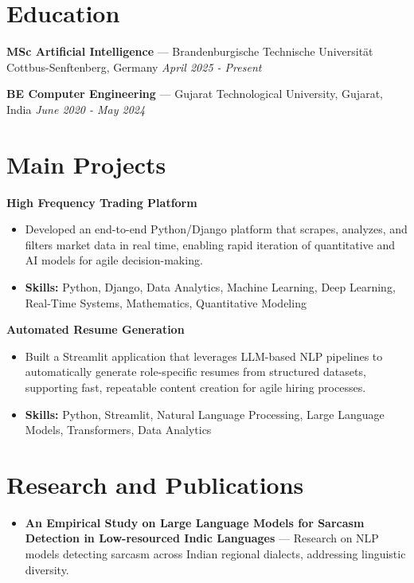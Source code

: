 \documentclass[a4paper,10pt]{article}
\begin{document}
\section*{Education}
\textbf{MSc Artificial Intelligence} — Brandenburgische Technische Universität Cottbus-Senftenberg, Germany \hfill \textit{April 2025 - Present}\par
\vspace{1.5pt}
\textbf{BE Computer Engineering} — Gujarat Technological University, Gujarat, India \hfill \textit{June 2020 - May 2024}\par

\section*{Main Projects}
\textbf{High Frequency Trading Platform}\par
\vspace{1pt}
\begin{itemize}
  \item Developed an end-to-end Python/Django platform that scrapes, analyzes, and filters market data in real time, enabling rapid iteration of quantitative and AI models for agile decision-making.
  \item \textbf{Skills:} Python, Django, Data Analytics, Machine Learning, Deep Learning, Real-Time Systems, Mathematics, Quantitative Modeling
\end{itemize}
\vspace{3pt}
\textbf{Automated Resume Generation}\par
\vspace{1pt}
\begin{itemize}
  \item Built a Streamlit application that leverages LLM-based NLP pipelines to automatically generate role-specific resumes from structured datasets, supporting fast, repeatable content creation for agile hiring processes.
  \item \textbf{Skills:} Python, Streamlit, Natural Language Processing, Large Language Models, Transformers, Data Analytics
\end{itemize}

\section*{Research and Publications}
\begin{itemize}
\item \textbf{An Empirical Study on Large Language Models for Sarcasm Detection in Low-resourced Indic Languages} — Research on NLP models detecting sarcasm across Indian regional dialects, addressing linguistic diversity.
\end{itemize}
\end{document}
